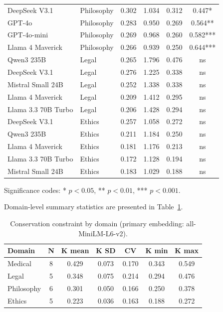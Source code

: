 \documentclass[11pt,a4paper]{article}
\begin{document}
\begin{longtable}{llcccc}
DeepSeek V3.1        & Philosophy & 0.302 & 1.034 & 0.312 & 0.447* \\
GPT-4o               & Philosophy & 0.283 & 0.950 & 0.269 & 0.564** \\
GPT-4o-mini          & Philosophy & 0.269 & 0.968 & 0.260 & 0.582*** \\
Llama 4 Maverick     & Philosophy & 0.266 & 0.939 & 0.250 & 0.644*** \\
\midrule
Qwen3 235B           & Legal      & 0.265 & 1.796 & 0.476 & ns \\
DeepSeek V3.1        & Legal      & 0.276 & 1.225 & 0.338 & ns \\
Mistral Small 24B    & Legal      & 0.252 & 1.338 & 0.338 & ns \\
Llama 4 Maverick     & Legal      & 0.209 & 1.412 & 0.295 & ns \\
Llama 3.3 70B Turbo  & Legal      & 0.206 & 1.428 & 0.294 & ns \\
\midrule
DeepSeek V3.1        & Ethics     & 0.257 & 1.058 & 0.272 & ns \\
Qwen3 235B           & Ethics     & 0.211 & 1.184 & 0.250 & ns \\
Llama 4 Maverick     & Ethics     & 0.181 & 1.176 & 0.213 & ns \\
Llama 3.3 70B Turbo  & Ethics     & 0.172 & 1.128 & 0.194 & ns \\
Mistral Small 24B    & Ethics     & 0.183 & 1.029 & 0.188 & ns \\
\end{longtable}

\noindent Significance codes: * $p < 0.05$, ** $p < 0.01$, *** $p < 0.001$.

Domain-level summary statistics are presented in Table~\ref{tab:domain_summary}.

\begin{table}[H]
\centering
\caption{Conservation constraint by domain (primary embedding: all-MiniLM-L6-v2).}
\label{tab:domain_summary}
\begin{tabular}{lcccccc}
\toprule
\textbf{Domain} & \textbf{N} & \textbf{K mean} & \textbf{K SD} & \textbf{CV} &
\textbf{K min} & \textbf{K max} \\
\midrule
Medical     & 8 & 0.429 & 0.073 & 0.170 & 0.343 & 0.549 \\
Legal       & 5 & 0.348 & 0.075 & 0.214 & 0.294 & 0.476 \\
Philosophy  & 6 & 0.301 & 0.050 & 0.166 & 0.250 & 0.378 \\
Ethics      & 5 & 0.223 & 0.036 & 0.163 & 0.188 & 0.272 \\
\bottomrule
\end{tabular}
\end{table}
\end{document}
